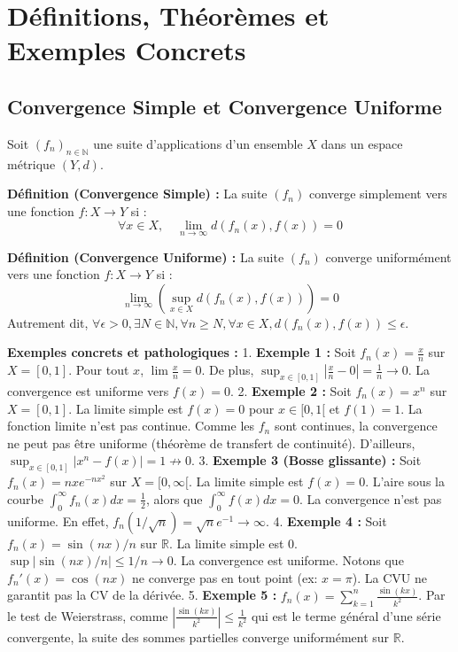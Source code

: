 \documentclass[11pt,a4paper]{article}
\begin{document}
\section{Définitions, Théorèmes et Exemples Concrets}

\subsection*{Convergence Simple et Convergence Uniforme}

Soit $(f_n)_{n \in \mathbb{N}}$ une suite d'applications d'un ensemble $X$ dans un espace métrique $(Y, d)$.

\textbf{Définition (Convergence Simple) :}
La suite $(f_n)$ converge simplement vers une fonction $f : X \to Y$ si :
$$ \forall x \in X, \quad \lim_{n \to \infty} d(f_n(x), f(x)) = 0 $$

\textbf{Définition (Convergence Uniforme) :}
La suite $(f_n)$ converge uniformément vers une fonction $f : X \to Y$ si :
$$ \lim_{n \to \infty} \left( \sup_{x \in X} d(f_n(x), f(x)) \right) = 0 $$
Autrement dit, $\forall \epsilon > 0, \exists N \in \mathbb{N}, \forall n \ge N, \forall x \in X, d(f_n(x), f(x)) \le \epsilon$.

\textbf{Exemples concrets et pathologiques :}
1. \textbf{Exemple 1 :} Soit $f_n(x) = \frac{x}{n}$ sur $X = [0, 1]$. Pour tout $x$, $\lim \frac{x}{n} = 0$. De plus, $\sup_{x \in [0,1]} \left| \frac{x}{n} - 0 \right| = \frac{1}{n} \to 0$. La convergence est uniforme vers $f(x)=0$.
2. \textbf{Exemple 2 :} Soit $f_n(x) = x^n$ sur $X = [0, 1]$. La limite simple est $f(x) = 0$ pour $x \in [0, 1[$ et $f(1) = 1$. La fonction limite n'est pas continue. Comme les $f_n$ sont continues, la convergence ne peut pas être uniforme (théorème de transfert de continuité). D'ailleurs, $\sup_{x \in [0,1]} |x^n - f(x)| = 1 \not\to 0$.
3. \textbf{Exemple 3 (Bosse glissante) :} Soit $f_n(x) = n x e^{-n x^2}$ sur $X = [0, \infty[$. La limite simple est $f(x) = 0$. L'aire sous la courbe $\int_0^\infty f_n(x)dx = \frac{1}{2}$, alors que $\int_0^\infty f(x)dx = 0$. La convergence n'est pas uniforme. En effet, $f_n(1/\sqrt{n}) = \sqrt{n} e^{-1} \to \infty$.
4. \textbf{Exemple 4 :} Soit $f_n(x) = \sin(nx)/n$ sur $\mathbb{R}$. La limite simple est $0$. $\sup |\sin(nx)/n| \le 1/n \to 0$. La convergence est uniforme. Notons que $f_n'(x) = \cos(nx)$ ne converge pas en tout point (ex: $x=\pi$). La CVU ne garantit pas la CV de la dérivée.
5. \textbf{Exemple 5 :} $f_n(x) = \sum_{k=1}^n \frac{\sin(kx)}{k^2}$. Par le test de Weierstrass, comme $|\frac{\sin(kx)}{k^2}| \le \frac{1}{k^2}$ qui est le terme général d'une série convergente, la suite des sommes partielles converge uniformément sur $\mathbb{R}$.
\end{document}
